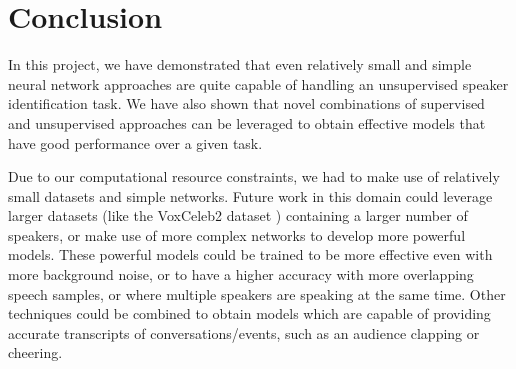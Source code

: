 \documentclass[10pt,twocolumn,letterpaper]{article}
\begin{document}
\section{Conclusion}

In this project, we have demonstrated that even relatively small and simple neural network approaches are quite capable of handling an unsupervised speaker identification task. We have also shown that novel combinations of supervised and unsupervised approaches can be leveraged to obtain effective models that have good performance over a given task.

Due to our computational resource constraints, we had to make use of relatively small datasets and simple networks. Future work in this domain could leverage larger datasets (like the VoxCeleb2 dataset \cite{base}) containing a larger number of speakers, or make use of more complex networks to develop more powerful models. These powerful models could be trained to be more effective even with more background noise, or to have a higher accuracy with more overlapping speech samples, or where multiple speakers are speaking at the same time. Other techniques could be combined to obtain models which are capable of providing accurate transcripts of conversations/events, such as an audience clapping or cheering.

\printbibliography
\end{document}
